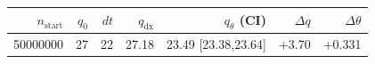 \begin{tabular}{r r r r r r r}
\hline
$n_{\mathrm{start}}$ & $q_0$ & $dt$ & $q_{\mathrm{dx}}$ & $q_{\theta}$ (CI) & $\Delta q$ & $\Delta\theta$ \\
\hline
50000000 & 27 & 22 & 27.18 & 23.49 [23.38,23.64] & +3.70 & +0.331 \\
\hline
\end{tabular}
